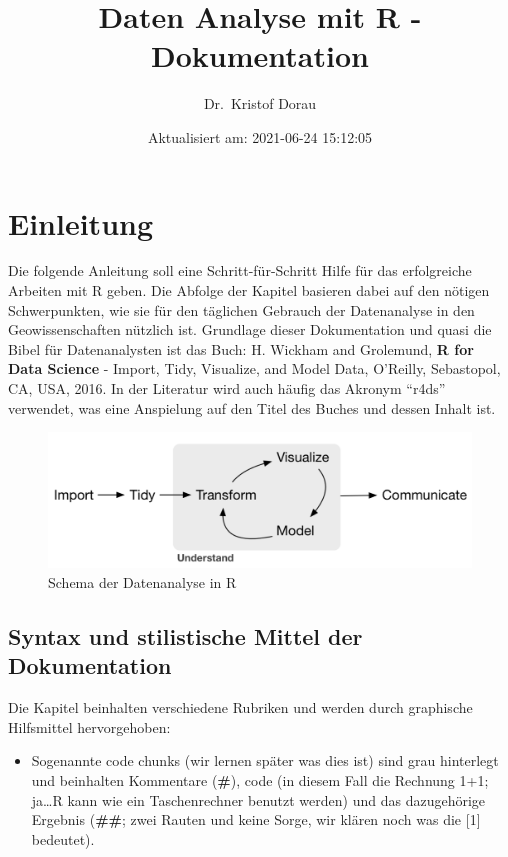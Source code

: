 \documentclass[
]{article}
\title{Daten Analyse mit R - Dokumentation}
\author{Dr.~Kristof Dorau}
\date{Aktualisiert am: 2021-06-24 15:12:05}
\providecommand{\tightlist}{%
  \setlength{\itemsep}{0pt}\setlength{\parskip}{0pt}}
\begin{document}
\maketitle

{
\setcounter{tocdepth}{2}
\tableofcontents
}
\hypertarget{einleitung}{%
\section{Einleitung}\label{einleitung}}

Die folgende Anleitung soll eine Schritt-für-Schritt Hilfe für das erfolgreiche Arbeiten mit R geben. Die Abfolge der Kapitel basieren dabei auf den nötigen Schwerpunkten, wie sie für den täglichen Gebrauch der Datenanalyse in den Geowissenschaften nützlich ist. Grundlage dieser Dokumentation und quasi die Bibel für Datenanalysten ist das Buch: H. Wickham and Grolemund, \textbf{R for Data Science} - Import, Tidy, Visualize, and Model Data, O'Reilly, Sebastopol, CA, USA, 2016. In der Literatur wird auch häufig das Akronym ``r4ds'' verwendet, was eine Anspielung auf den Titel des Buches und dessen Inhalt ist.

\begin{figure}

{\centering \includegraphics[width=18.53in]{images/001} 

}

\caption{Schema der Datenanalyse in R}\label{fig:unnamed-chunk-2}
\end{figure}

\hypertarget{syntax-und-stilistische-mittel-der-dokumentation}{%
\subsection{Syntax und stilistische Mittel der Dokumentation}\label{syntax-und-stilistische-mittel-der-dokumentation}}

Die Kapitel beinhalten verschiedene Rubriken und werden durch graphische Hilfsmittel hervorgehoben:

\begin{itemize}
\tightlist
\item
  Sogenannte code chunks (wir lernen später was dies ist) sind grau hinterlegt und beinhalten Kommentare (\textbf{\#}), code (in diesem Fall die Rechnung 1+1; ja\ldots R kann wie ein Taschenrechner benutzt werden) und das dazugehörige Ergebnis (\textbf{\#\#}; zwei Rauten und keine Sorge, wir klären noch was die {[}1{]} bedeutet).
\end{itemize}
\end{document}
